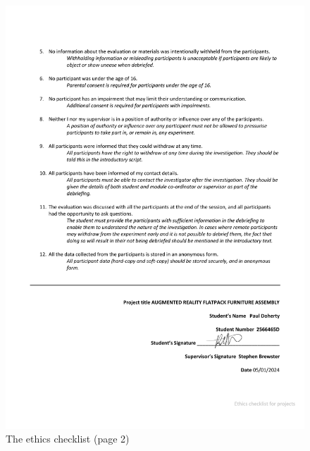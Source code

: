 \documentclass{l4proj}
\begin{document}
\begin{appendices}
\begin{figure}
    \centering
    \includegraphics[width=1\linewidth]{dissertation//images/ethicsChecklist2.pdf}
    \caption{The ethics checklist (page 2)}
\end{figure}


\end{appendices}
\end{document}
